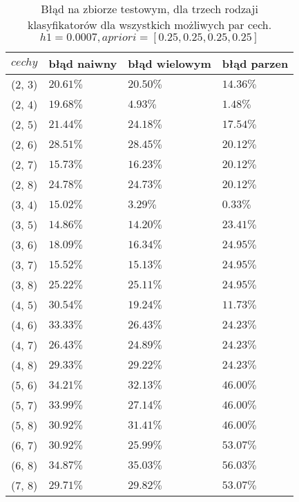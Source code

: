 \documentclass[fleqn]{article}
\begin{document}
\begin {table}
\begin{center}
\begin{tabular}{clll}
    \hline
    $cechy$ & błąd naiwny & błąd wielowym & błąd parzen \\
    \hline
    ($2$, $3$) & $20.61\%$ & $20.50\%$ & $14.36\%$\\
    ($2$, $4$) & $19.68\%$ & $4.93\%$ & $1.48\%$\\
    ($2$, $5$) & $21.44\%$ & $24.18\%$ & $17.54\%$\\
    ($2$, $6$) & $28.51\%$ & $28.45\%$ & $20.12\%$\\
    ($2$, $7$) & $15.73\%$ & $16.23\%$ & $20.12\%$\\
    ($2$, $8$) & $24.78\%$ & $24.73\%$ & $20.12\%$\\
    ($3$, $4$) & $15.02\%$ & $3.29\%$ & $0.33\%$\\
    ($3$, $5$) & $14.86\%$ & $14.20\%$ & $23.41\%$\\
    ($3$, $6$) & $18.09\%$ & $16.34\%$ & $24.95\%$\\
    ($3$, $7$) & $15.52\%$ & $15.13\%$ & $24.95\%$\\
    ($3$, $8$) & $25.22\%$ & $25.11\%$ & $24.95\%$\\
    ($4$, $5$) & $30.54\%$ & $19.24\%$ & $11.73\%$\\
    ($4$, $6$) & $33.33\%$ & $26.43\%$ & $24.23\%$\\
    ($4$, $7$) & $26.43\%$ & $24.89\%$ & $24.23\%$\\
    ($4$, $8$) & $29.33\%$ & $29.22\%$ & $24.23\%$\\
    ($5$, $6$) & $34.21\%$ & $32.13\%$ & $46.00\%$\\
    ($5$, $7$) & $33.99\%$ & $27.14\%$ & $46.00\%$\\
    ($5$, $8$) & $30.92\%$ & $31.41\%$ & $46.00\%$\\
    ($6$, $7$) & $30.92\%$ & $25.99\%$ & $53.07\%$\\
    ($6$, $8$) & $34.87\%$ & $35.03\%$ & $56.03\%$\\
    ($7$, $8$) & $29.71\%$ & $29.82\%$ & $53.07\%$\\
    \hline
\end{tabular}
\caption {Błąd na zbiorze testowym, dla trzech rodzaji klasyfikatorów dla wszystkich możliwych par cech. $h1=0.0007, apriori = [0.25,0.25,0.25,0.25]$}
\label{table:1}
\end{center}
\end {table}
\end{document}
